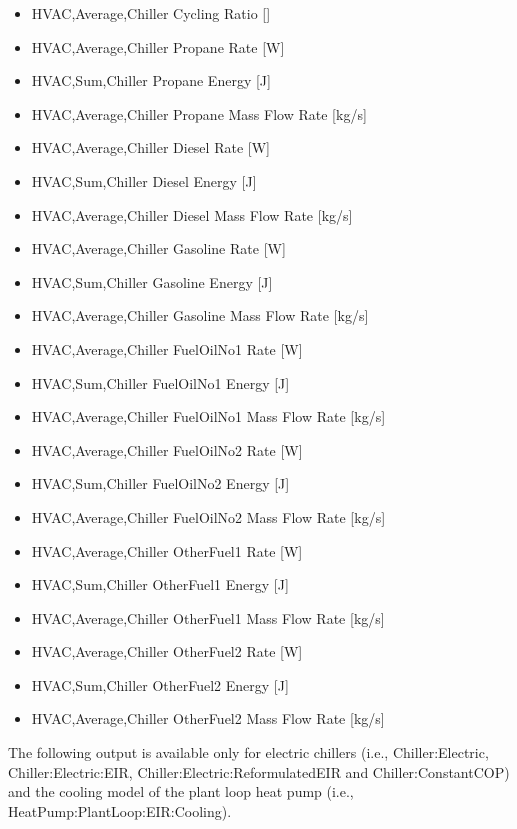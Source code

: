 \begin{itemize}
    \item
    HVAC,Average,Chiller Cycling Ratio {[]}
    \item
    HVAC,Average,Chiller Propane Rate {[}W{]}
    \item
    HVAC,Sum,Chiller Propane Energy {[}J{]}
    \item
    HVAC,Average,Chiller Propane Mass Flow Rate {[}kg/s{]}
    \item
    HVAC,Average,Chiller Diesel Rate {[}W{]}
    \item
    HVAC,Sum,Chiller Diesel Energy {[}J{]}
    \item
    HVAC,Average,Chiller Diesel Mass Flow Rate {[}kg/s{]}
    \item
    HVAC,Average,Chiller Gasoline Rate {[}W{]}
    \item
    HVAC,Sum,Chiller Gasoline Energy {[}J{]}
    \item
    HVAC,Average,Chiller Gasoline Mass Flow Rate {[}kg/s{]}
    \item
    HVAC,Average,Chiller FuelOilNo1 Rate {[}W{]}
    \item
    HVAC,Sum,Chiller FuelOilNo1 Energy {[}J{]}
    \item
    HVAC,Average,Chiller FuelOilNo1 Mass Flow Rate {[}kg/s{]}
    \item
    HVAC,Average,Chiller FuelOilNo2 Rate {[}W{]}
    \item
    HVAC,Sum,Chiller FuelOilNo2 Energy {[}J{]}
    \item
    HVAC,Average,Chiller FuelOilNo2 Mass Flow Rate {[}kg/s{]}
    \item
    HVAC,Average,Chiller OtherFuel1 Rate {[}W{]}
    \item
    HVAC,Sum,Chiller OtherFuel1 Energy {[}J{]}
    \item
    HVAC,Average,Chiller OtherFuel1 Mass Flow Rate {[}kg/s{]}
    \item
    HVAC,Average,Chiller OtherFuel2 Rate {[}W{]}
    \item
    HVAC,Sum,Chiller OtherFuel2 Energy {[}J{]}
    \item
    HVAC,Average,Chiller OtherFuel2 Mass Flow Rate {[}kg/s{]}
\end{itemize}

The following output is available only for electric chillers (i.e., Chiller:Electric, Chiller:Electric:EIR, Chiller:Electric:ReformulatedEIR and Chiller:ConstantCOP) and the cooling model of the plant loop heat pump (i.e., HeatPump:PlantLoop:EIR:Cooling).

